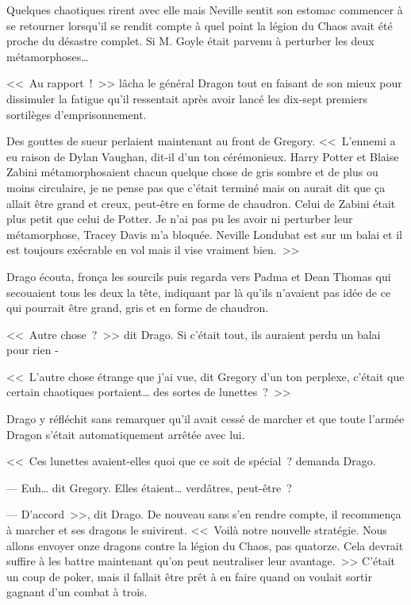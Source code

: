 Quelques chaotiques rirent avec elle mais Neville sentit son estomac commencer à se retourner lorsqu'il se rendit compte à quel point la légion du Chaos avait été proche du désastre complet. Si M. Goyle était parvenu à perturber les deux métamorphoses…

\later

<<~Au rapport~!~>> lâcha le général Dragon tout en faisant de son mieux pour dissimuler la fatigue qu'il ressentait après avoir lancé les dix-sept premiers sortilèges d'emprisonnement.

Des gouttes de sueur perlaient maintenant au front de Gregory. <<~L'ennemi a eu raison de Dylan Vaughan, dit-il d'un ton cérémonieux. Harry Potter et Blaise Zabini métamorphosaient chacun quelque chose de gris sombre et de plus ou moins circulaire, je ne pense pas que c'était terminé mais on aurait dit que ça allait être grand et creux, peut-être en forme de chaudron. Celui de Zabini était plus petit que celui de Potter. Je n'ai pas pu les avoir ni perturber leur métamorphose, Tracey Davis m'a bloquée. Neville Londubat est sur un balai et il est toujours exécrable en vol mais il vise vraiment bien.~>>

Drago écouta, fronça les sourcils puis regarda vers Padma et Dean Thomas qui secouaient tous les deux la tête, indiquant par là qu'ils n'avaient pas idée de ce qui pourrait être grand, gris et en forme de chaudron.

<<~Autre chose~?~>> dit Drago. Si c'était tout, ils auraient perdu un balai pour rien -

<<~L'autre chose étrange que j'ai vue, dit Gregory d'un ton perplexe, c'était que certain chaotiques portaient… des sortes de lunettes~?~>>

Drago y réfléchit sans remarquer qu'il avait cessé de marcher et que toute l'armée Dragon s'était automatiquement arrêtée avec lui.

<<~Ces lunettes avaient-elles quoi que ce soit de spécial~? demanda Drago.

--- Euh… dit Gregory. Elles étaient… verdâtres, peut-être~?

--- D'accord~>>, dit Drago. De nouveau sans s'en rendre compte, il recommença à marcher et ses dragons le suivirent. <<~Voilà notre nouvelle stratégie. Nous allons envoyer onze dragons contre la légion du Chaos, pas quatorze. Cela devrait suffire à les battre maintenant qu'on peut neutraliser leur avantage.~>> C'était un coup de poker, mais il fallait être prêt à en faire quand on voulait sortir gagnant d'un combat à trois.

